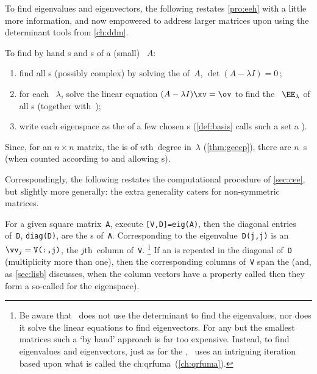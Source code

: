 To find eigenvalues and eigenvectors, the following restates \autoref{pro:eeh} with a little more information, and now empowered to address larger matrices upon using the determinant tools from \autoref{ch:ddm}.

\begin{procedure} \label{pro:geneig}
To find by hand s and s of a (small) ~\(A\):
\begin{enumerate}
\item find all s (possibly complex) by solving the  of~\(A\), \(\det(A-\lambda I)=0\)\,;
\item for each ~\(\lambda\), solve the  linear equation \((A-\lambda I)\xv=\ov\) to find the ~\(\EE_\lambda\) of all s (together with~\ov);
\item write each eigenspace as the  of a few chosen s  (\autoref{def:basis} calls such a set a ).
\end{enumerate}
Since, for an \(n\times n\) matrix, the  is of \(n\)th~degree in~\(\lambda\) (\autoref{thm:geecp}), there are \(n\)~s (when counted according to  and allowing s).
\end{procedure}

Correspondingly, the following restates the computational procedure of \autoref{sec:cee}, but slightly more generally: the extra generality caters for non-symmetric matrices.

\begin{compute}
For a given square matrix~\verb|A|, execute \verb|[V,D]=eig(A)|, then the diagonal entries of~\verb|D|, \verb|diag(D)|, are the s of~\verb|A|. 
Corresponding to the eigenvalue~\verb|D(j,j)| is an   \(\vv_j=\verb|V(:,j)|\), the \(j\)th~column of~\verb|V|.  
\footnote{Be aware that \script\ does not use the determinant to find the eigenvalues, nor does it solve the linear equations to find eigenvectors.  
For any but the smallest matrices such a `by hand' approach is far too expensive.  
Instead, to find eigenvalues and eigenvectors, just as for the \svd, \script\ uses an intriguing iteration based upon what is called the \ifcsname ch:qrfuma\endcsname\ (\autoref{ch:qrfuma})\fi.}
If an  is repeated in the diagonal of~\verb|D| (multiplicity more than one), then the corresponding columns of~\verb|V| span the  
(and, as \autoref{sec:lisb} discusses, when the column vectors have a property called  then they form a so-called  for the eigenspace). 
\end{compute}



